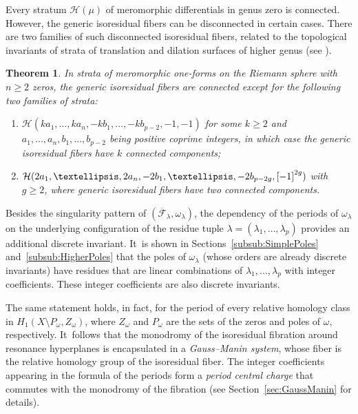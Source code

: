 \documentclass[11pt]{article}
\newtheorem{thm}{Theorem}[section]
\theoremstyle{definition}
\begin{document}
Every stratum $\mathcal{H}(\mu)$ of meromorphic differentials in genus zero is connected. However, the generic isoresidual fibers can be disconnected in certain cases. There are two families of such disconnected isoresidual fibers, related to the topological invariants of strata of translation and dilation surfaces of higher genus (see \cite{Bo,ABW}).
\begin{thm}\label{thm:MAIN5}
In strata of meromorphic one-forms on the Riemann sphere with $n \geq 2$ zeros, the generic isoresidual fibers are connected except for the following two families of strata:
\begin{enumerate}
\item\label{thm:MAIN51}
$\mathcal{H}(ka_{1},\dots,ka_{n},-kb_{1},\dots,-kb_{p-2},-1,-1)$ for some $k \geq 2$ and $a_{1},\dots,a_{n},\allowbreak b_{1},\dots,b_{p-2}$ being positive coprime integers, in which case the generic isoresidual fibers have $k$ connected components;

\item\label{thm:MAIN52}
$\mathcal{H}(2a_{1},\dots,2a_{n},-2b_{1},\dots,-2b_{p-2g},\rec[-1][2g])$ with $g \geq 2$, where generic isoresidual fibers have two connected components.
\end{enumerate}
\end{thm}

Besides the singularity pattern of $(\overline{\mathcal{F}}_{\lambda},\omega_{\lambda})$, the dependency of the periods of $\omega_{\lambda}$ on the underlying configuration of the residue tuple $\lambda = (\lambda_{1},\ldots,\lambda_{p})$ provides an additional discrete invariant. It~is shown in Sections~\ref{subsub:SimplePoles} and~\ref{subsub:HigherPoles} that the poles of $\omega_{\lambda}$ (whose orders are already discrete invariants) have residues that are linear combinations of $\lambda_{1},\dots,\lambda_{p}$ with integer coefficients. These integer coefficients are also discrete invariants.

The same statement holds, in fact, for the period of every relative homology class in $H_{1}(X \setminus P_{\omega},Z_{\omega})$, where $Z_{\omega}$ and $P_{\omega}$ are the sets of the zeros and poles of $\omega$, respectively. It~follows that the monodromy of the isoresidual fibration around resonance hyperplanes is encapsulated in a \textit{Gauss--Manin system}, whose fiber is the relative homology group of the isoresidual fiber. The integer coefficients appearing in the \hbox{formula} of the periods form a \textit{period central charge} that commutes with the monodromy of the fibration (see Section~\ref{sec:GaussManin} for details).
\end{document}
